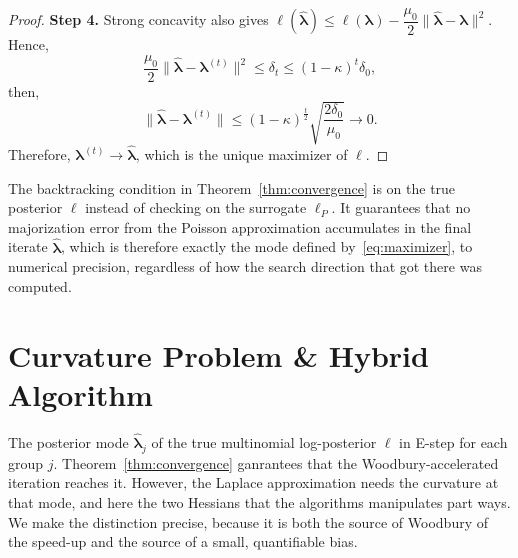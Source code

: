\begin{proof}
    \noindent\textbf{Step 4.} Strong concavity also gives $\ell(\hat{\bm{\lambda}})\leq\ell(\bm{\lambda})-\dfrac{\mu_{0}}{2}\|\hat{\bm{\lambda}}-\bm{\lambda}\|^{2}$. Hence, 
    \begin{equation}
        \dfrac{\mu_{0}}{2}\|\hat{\bm{\lambda}}-\bm{\lambda}^{(t)}\|^{2}\leq \delta_{t}\leq (1-\kappa)^{t}\delta_{0},
        \label{eq:step4-1}
    \end{equation}
    then,
    \begin{equation}
        \|\hat{\bm{\lambda}}-\bm{\lambda}^{(t)}\|\leq (1-\kappa)^{\frac{t}{2}}\sqrt{\frac{2\delta_{0}}{\mu_{0}}}\to 0.
        \label{eq:step4-2}
    \end{equation}
    Therefore, $\bm{\lambda}^{(t)}\to \hat{\bm{\lambda}}$, which is the unique maximizer of $\ell$.
\end{proof}

\begin{remark}
    The backtracking condition in Theorem~\ref{thm:convergence} is on the true posterior $\ell$ instead of checking on the surrogate $\ell_{P}$. It guarantees that no majorization error from the Poisson approximation accumulates in the final iterate $\hat{\bm{\lambda}}$, which is therefore exactly the mode defined by~\eqref{eq:maximizer}, to numerical precision, regardless of how the search direction that got there was computed.
\end{remark}

\section{Curvature Problem \& Hybrid Algorithm}
\label{sec:curvature-problem-hybrid-algorithm}

The posterior mode $\hat{\bm{\lambda}}_{j}$ of the true multinomial log-posterior $\ell$ in E-step for each group $j$. Theorem~\ref{thm:convergence} ganrantees that the Woodbury-accelerated iteration reaches it. However, the Laplace approximation needs the curvature at that mode, and here the two Hessians that the algorithms manipulates part ways. We make the distinction precise, because it is both the source of Woodbury of the speed-up and the source of a small, quantifiable bias.

